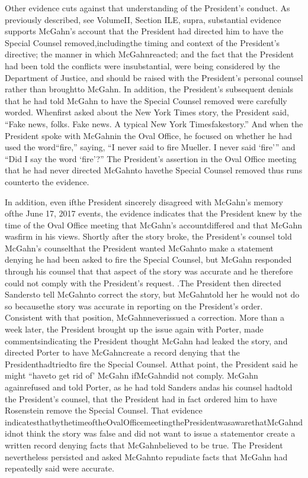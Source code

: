 Other evidence cuts against that understanding of the President’s conduct. As previously described, see VolumeII, Section ILE, supra, substantial evidence supports McGahn’s account that the President had directed him to have the Special Counsel removed,includingthe timing and context of the President’s directive; the manner in which McGahnreacted; and the fact that the President had been told the conflicts were insubstantial, were being considered by the Department of Justice, and should be raised with the President’s personal counsel rather than broughtto McGahn. In addition, the President’s subsequent denials that he had told McGahn to have the Special Counsel removed were carefully worded. Whenfirst asked about the New York Times story, the President said, “Fake news, folks. Fake news. A typical New York Timesfakestory.” And when the President spoke with McGahnin the Oval Office, he focused on whether he had used the word“fire,” saying, “I never said to fire Mueller. I never said ‘fire’” and “Did I say the word ‘fire’?” The President’s assertion in the Oval Office meeting that he had never directed McGahnto havethe Special Counsel removed thus runs counterto the evidence.

In addition, even ifthe President sincerely disagreed with McGahn’s memory ofthe June 17, 2017 events, the evidence indicates that the President knew by the time of the Oval Office
meeting that McGahn’s accountdiffered and that McGahn wasfirm in his views. Shortly after the story broke, the President’s counsel told McGahn’s counselthat the President wanted McGahnto make a statement denying he had been asked to fire the Special Counsel, but McGahn responded through his counsel that that aspect of the story was accurate and he therefore could not comply with the President’s request. .The President then directed Sandersto tell McGahnto correct the story, but McGahntold her he would not do so becausethe story was accurate in reporting on the President’s order. Consistent with that position, McGahnneverissued a correction. More than a week later, the President brought up the issue again with Porter, made commentsindicating the President thought McGahn had leaked the story, and directed Porter to have McGahncreate a record denying that the Presidenthadtriedto fire the Special Counsel. Atthat point, the President said he might “haveto get rid of’ McGahn ifMcGahndid not comply. McGahn againrefused and told Porter, as he had told Sanders andas his counsel hadtold the President’s counsel, that the President had in fact ordered him to have Rosenstein remove the Special Counsel. That evidence indicatesthatbythetimeoftheOvalOfficemeetingthePresidentwasawarethatMcGahndidnot think the story was false and did not want to issue a statementor create a written record denying facts that McGahnbelieved to be true. The President nevertheless persisted and asked McGahnto repudiate facts that McGahn had repeatedly said were accurate.

